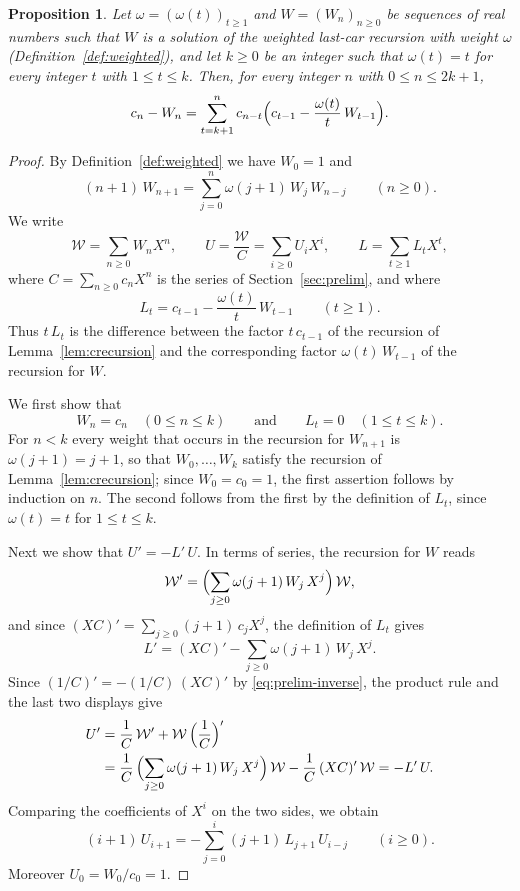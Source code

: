 \documentclass{amsart}
\newtheorem{proposition}[theorem]{Proposition}
\theoremstyle{definition}
\theoremstyle{remark}
\numberwithin{equation}{section}
\begin{document}
\begin{proposition}\label{prop:forward}
Let $\omega=(\omega(t))_{t\ge 1}$ and $W=(W_n)_{n\ge 0}$ be sequences of real numbers such that $W$ is a solution of the weighted last-car recursion with weight $\omega$ (Definition~\ref{def:weighted}), and let $k\ge 0$ be an integer such that $\omega(t)=t$ for every integer $t$ with $1\le t\le k$. Then, for every integer $n$ with $0\le n\le 2k+1$,
\[
c_n-W_n=\sum_{t=k+1}^{n}c_{n-t}\Bigl(c_{t-1}-\frac{\omega(t)}{t}\,W_{t-1}\Bigr).
\]
\end{proposition}

\begin{proof}
By Definition~\ref{def:weighted} we have $W_0=1$ and
\[
(n+1)\,W_{n+1}=\sum_{j=0}^{n}\omega(j+1)\,W_j\,W_{n-j}\qquad(n\ge 0).
\]
We write
\[
\mathcal{W}=\sum_{n\ge 0}W_nX^n,\qquad U=\frac{\mathcal{W}}{C}=\sum_{i\ge 0}U_iX^i,\qquad L=\sum_{t\ge 1}L_tX^t,
\]
where $C=\sum_{n\ge 0}c_nX^n$ is the series of Section~\ref{sec:prelim}, and where
\[
L_t=c_{t-1}-\frac{\omega(t)}{t}\,W_{t-1}\qquad(t\ge 1).
\]
Thus $t\,L_t$ is the difference between the factor $t\,c_{t-1}$ of the recursion of Lemma~\ref{lem:crecursion} and the corresponding factor $\omega(t)\,W_{t-1}$ of the recursion for $W$.

We first show that
\[
W_n=c_n\quad(0\le n\le k)\qquad\text{and}\qquad L_t=0\quad(1\le t\le k).
\]
For $n<k$ every weight that occurs in the recursion for $W_{n+1}$ is $\omega(j+1)=j+1$, so that $W_0,\dots,W_k$ satisfy the recursion of Lemma~\ref{lem:crecursion}; since $W_0=c_0=1$, the first assertion follows by induction on $n$. The second follows from the first by the definition of $L_t$, since $\omega(t)=t$ for $1\le t\le k$.

Next we show that $U'=-L'\,U$. In terms of series, the recursion for $W$ reads
\[
\mathcal{W}'=\Bigl(\sum_{j\ge 0}\omega(j+1)\,W_j\,X^j\Bigr)\,\mathcal{W},
\]
and since $(XC)'=\sum_{j\ge 0}(j+1)\,c_jX^j$, the definition of $L_t$ gives
\[
L'=(XC)'-\sum_{j\ge 0}\omega(j+1)\,W_j\,X^j .
\]
Since $(1/C)'=-(1/C)\,(XC)'$ by \eqref{eq:prelim-inverse}, the product rule and the last two displays give
\begin{align*}
U'&=\frac1C\,\mathcal{W}'+\mathcal{W}\,\Bigl(\frac1C\Bigr)'\\
&=\frac1C\,\Bigl(\sum_{j\ge 0}\omega(j+1)\,W_j\,X^j\Bigr)\,\mathcal{W}-\frac1C\,(XC)'\,\mathcal{W}
=-L'\,U .
\end{align*}
Comparing the coefficients of $X^i$ on the two sides, we obtain
\[
(i+1)\,U_{i+1}=-\sum_{j=0}^{i}(j+1)\,L_{j+1}\,U_{i-j}\qquad(i\ge 0).
\]
Moreover $U_0=W_0/c_0=1$.


\end{proof}
\end{document}
